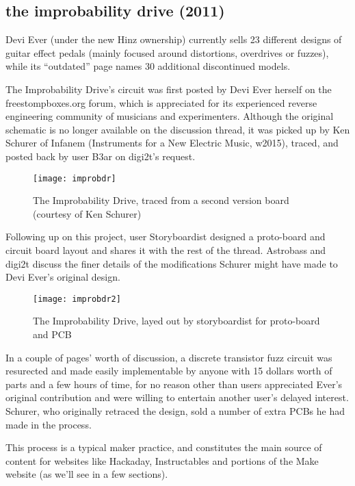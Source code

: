 \subsection{the improbability drive (2011)}

Devi Ever (under the new Hinz ownership) currently sells 23 different designs of guitar effect pedals (mainly focused around distortions, overdrives or fuzzes), while its ``outdated'' page names 30 additional discontinued models. 

The Improbability Drive's circuit was first posted by Devi Ever herself on the freestompboxes.org forum, which is appreciated for its experienced reverse engineering community of musicians and experimenters. Although the original schematic is no longer available on the discussion thread, it was picked up by Ken Schurer of Infanem (Instruments for a New Electric Music, w2015), traced, and posted back by user B3ar on digi2t's request. 

	\begin{figure}[h!]
	  \caption{The Improbability Drive, traced from a second version board (courtesy of Ken Schurer)}
	  \centering
	    \texttt{[image: improbdr]}
	\end{figure}
	
Following up on this project, user Storyboardist designed a proto-board and circuit board layout and shares it with the rest of the thread. Astrobass and digi2t discuss the finer details of the modifications Schurer might have made to Devi Ever's original design. 

	\begin{figure}[h!]
	  \caption{The Improbability Drive, layed out by storyboardist for proto-board and PCB}
	  \centering
	    \texttt{[image: improbdr2]}
	\end{figure}

In a couple of pages' worth of discussion, a discrete transistor fuzz circuit was resurected and made easily implementable by anyone with 15 dollars worth of parts and a few hours of time, for no reason other than users appreciated Ever's original contribution and were willing to entertain another user's delayed interest. Schurer, who originally retraced the design, sold a number of extra PCBs he had made in the process. 

This process is a typical maker practice, and constitutes the main source of content for websites like Hackaday, Instructables and portions of the Make website (as we'll see in a few sections). 

